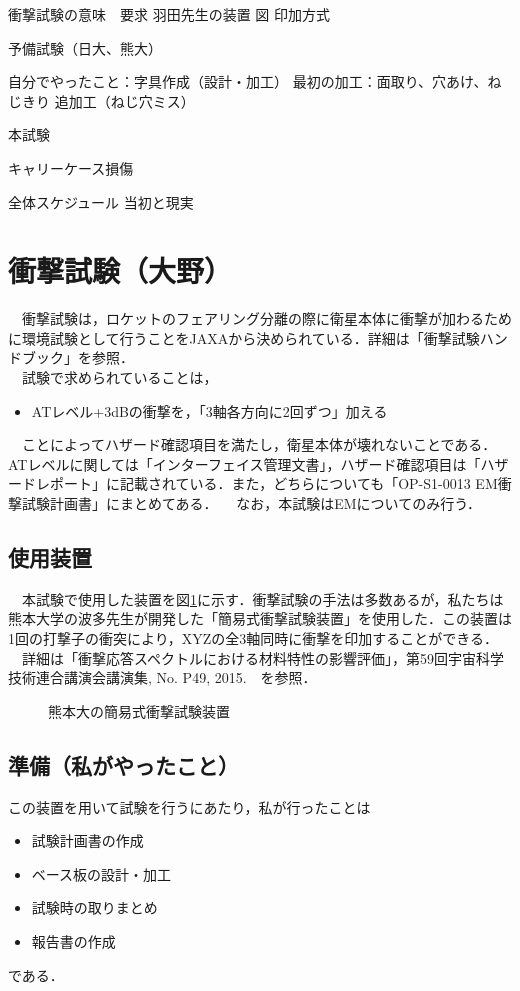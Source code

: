 衝撃試験の意味　要求
羽田先生の装置
図
印加方式


予備試験（日大、熊大）

自分でやったこと：字具作成（設計・加工） 
最初の加工：面取り、穴あけ、ねじきり
追加工（ねじ穴ミス）

本試験

キャリーケース損傷

全体スケジュール
当初と現実
\fi


\section{衝撃試験（大野）}
　衝撃試験は，ロケットのフェアリング分離の際に衛星本体に衝撃が加わるために環境試験として行うことをJAXAから決められている．詳細は「衝撃試験ハンドブック」を参照．\\
　試験で求められていることは，
\begin{itemize}
 \item ATレベル+3dBの衝撃を，「3軸各方向に2回ずつ」加える
\end{itemize}
　ことによってハザード確認項目を満たし，衛星本体が壊れないことである．ATレベルに関しては「インターフェイス管理文書」，ハザード確認項目は「ハザードレポート」に記載されている．また，どちらについても「OP-S1-0013 EM衝撃試験計画書」にまとめてある．
　なお，本試験はEMについてのみ行う．

\subsection{使用装置}
　本試験で使用した装置を図\ref{fig4-4-1}に示す．衝撃試験の手法は多数あるが，私たちは熊本大学の波多先生が開発した「簡易式衝撃試験装置」を使用した．この装置は1回の打撃子の衝突により，XYZの全3軸同時に衝撃を印加することができる．\\
　詳細は「衝撃応答スペクトルにおける材料特性の影響評価」，第59回宇宙科学技術連合講演会講演集, No. P49, 2015.　を参照．
\begin{figure}[H]
	\centering
	\caption{熊本大の簡易式衝撃試験装置}
	\label{fig4-4-1}
\end{figure}
\subsection{準備（私がやったこと）}
この装置を用いて試験を行うにあたり，私が行ったことは
\begin{itemize}
 \item 試験計画書の作成
 \item ベース板の設計・加工
 \item 試験時の取りまとめ
 \item 報告書の作成
\end{itemize}
である．
